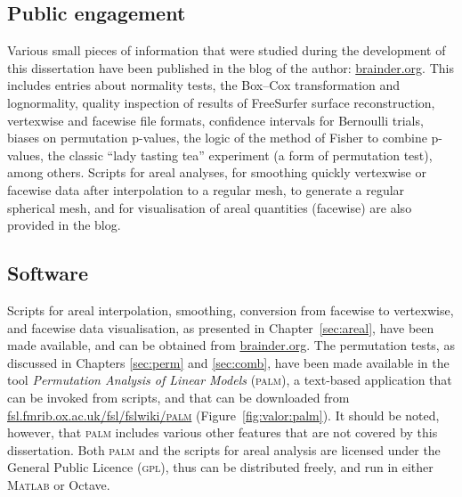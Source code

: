 \subsection{Public engagement}

Various small pieces of information that were studied during the development of this dissertation have been published in the blog of the author: \href{http://brainder.org}{brainder.org}. This includes entries about normality tests, the Box--Cox transformation and log\-normality, quality inspection of results of FreeSurfer surface reconstruction, vertexwise and facewise file formats, confidence intervals for Bernoulli trials, biases on permutation p-values, the logic of the method of Fisher to combine p-values, the classic ``lady tasting tea'' experiment (a form of permutation test), among others. Scripts for areal analyses, for smoothing quickly vertexwise or facewise data after interpolation to a regular mesh, to generate a regular spherical mesh, and for visualisation of areal quantities (facewise) are also provided in the blog.

\subsection{Software}

Scripts for areal interpolation, smoothing, conversion from facewise to vertexwise, and facewise data visualisation, as presented in Chapter~\ref{sec:areal}, have been made available, and can be obtained from \href{http://brainder.org}{brainder.org}. The permutation tests, as discussed in Chapters \ref{sec:perm} and \ref{sec:comb}, have been made available in the tool \emph{Permutation Analysis of Linear Models} (\textsc{palm}), a text-based application that can be invoked from scripts, and that can be downloaded from \href{http://fsl.fmrib.ox.ac.uk/fsl/fslwiki/PALM}{fsl.fmrib.ox.ac.uk/fsl/fslwiki/\textsc{palm}} (Figure~\ref{fig:valor:palm}). It should be noted, however, that \textsc{palm} includes various other features that are not covered by this dissertation. Both \textsc{palm} and the scripts for areal analysis are licensed under the General Public Licence (\textsc{gpl}), thus can be distributed freely, and run in either \textsc{Matlab} or Octave.

